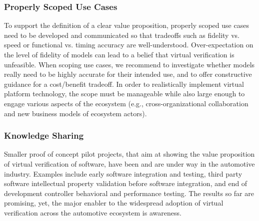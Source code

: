 \subsubsection*{Properly Scoped Use Cases}
To support the definition of a clear value proposition,
properly scoped use cases need to be {developed and} communicated so that tradeoffs such as fidelity vs. speed or functional vs. timing accuracy are well-understood.
Over-expectation on the level of fidelity of models %
can lead to a belief that virtual verification is unfeasible.
When scoping use cases, we recommend to  
investigate whether models really need to be highly accurate for their intended use, and to offer constructive guidance for a cost/benefit tradeoff.
In order to realistically implement virtual platform technology,
the scope must be manageable while also large enough to engage various aspects of the ecosystem
(e.g., cross-organizational collaboration and new business models of ecosystem actors).


\subsubsection*{Knowledge Sharing}
Smaller proof of concept pilot projects, that aim at showing the value proposition of virtual verification of software, have been and are under way in the automotive industry.
Examples include early software integration and testing, third party software intellectual property validation before software integration, and end of development controller behavioral and performance testing.
The results so far are promising, yet, the major enabler to the widespread adoption of virtual verification across the automotive ecosystem is awareness.

